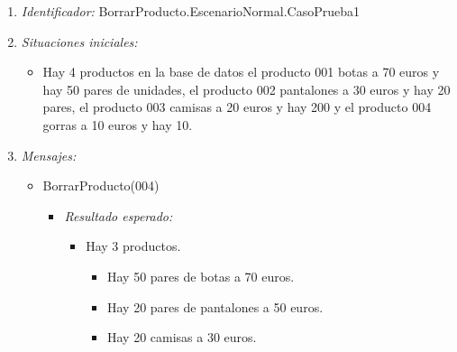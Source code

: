 \begin{enumerate}
\item {\it Identificador:} BorrarProducto.EscenarioNormal.CasoPrueba1
\item {\it Situaciones iniciales:}
  \begin{itemize}
  \item Hay 4 productos en la base de datos el producto 001 botas a 70 euros y hay 50 pares de unidades, el producto 002 pantalones a 30 euros y hay 20 pares, el producto 003 camisas a 20 euros y hay 200 y el producto 004 gorras a 10 euros y hay 10.
  \end{itemize}
\item {\it Mensajes:}
  \begin{itemize}
  \item BorrarProducto(004)
    \begin{itemize}
    \item {\it Resultado esperado:}
      \begin{itemize}
      \item Hay 3 productos.
        \begin{itemize}
        \item Hay 50 pares de botas a 70 euros.
        \item Hay 20 pares de pantalones a 50 euros.
        \item Hay 20 camisas a 30 euros.
        \end{itemize}
      \end{itemize}
    \end{itemize}
  \end{itemize}
\end{enumerate}

